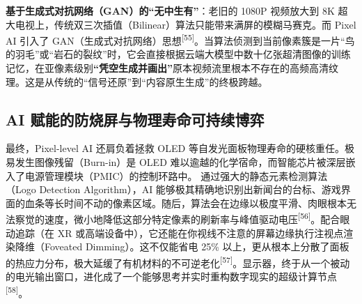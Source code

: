 \documentclass[12pt, a4paper]{ctexart}
\newcommand{\scite}[1]{\textsuperscript{[#1]}}
\begin{document}
\textbf{基于生成式对抗网络（GAN）的“无中生有”}：老旧的 1080P 视频放大到 8K 超大电视上，传统双三次插值（Bilinear）算法只能带来满屏的模糊马赛克。而 Pixel AI 引入了 GAN（生成式对抗网络）思想\scite{55}。当算法侦测到当前像素簇是一片“鸟的羽毛”或“岩石的裂纹”时，它会直接根据云端大模型中数十亿张超清图像的训练记忆，在亚像素级别\textbf{“凭空生成并画出”}原本视频流里根本不存在的高频高清纹理。这是从传统的“信号还原”到“内容原生生成”的终极跨越。

\subsection{AI 赋能的防烧屏与物理寿命可持续博弈}

最终，Pixel-level AI 还肩负着拯救 OLED 等自发光面板物理寿命的硬核重任。极易发生图像残留（Burn-in）是 OLED 难以逾越的化学宿命，而智能芯片被深层嵌入了电源管理模块（PMIC）的控制环路中。
通过强大的静态元素检测算法（Logo Detection Algorithm），AI 能够极其精确地识别出新闻台的台标、游戏界面的血条等长时间不动的像素区域。随后，算法会在边缘以极度平滑、肉眼根本无法察觉的速度，微小地降低这部分特定像素的刷新率与峰值驱动电压\scite{56}。配合眼动追踪（在 XR 或高端设备中），它还能在你视线不注意的屏幕边缘执行注视点渲染降维（Foveated Dimming）。这不仅能省电 25\% 以上，更从根本上分散了面板的热应力分布，极大延缓了有机材料的不可逆老化\scite{57}。显示器，终于从一个被动的电光输出窗口，进化成了一个能够思考并实时重构数字现实的超级计算节点\scite{58}。
\end{document}
